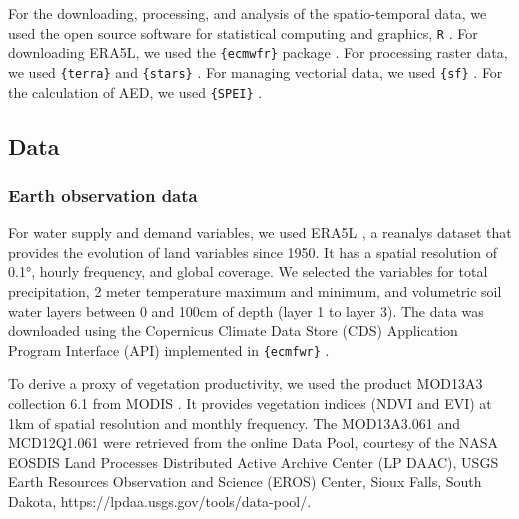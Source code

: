 \documentclass[
  number,
  preprint,
  3p,
  onecolumn]{elsarticle}
\begin{document}
For the downloading, processing, and analysis of the spatio-temporal
data, we used the open source software for statistical computing and
graphics, \texttt{R} \citep{R2023}. For downloading ERA5L, we used the
\texttt{\{ecmwfr\}} package \citep{Hufkens2019}. For processing raster
data, we used \texttt{\{terra\}} \citep{Hijmans2023} and
\texttt{\{stars\}} \citep{Pebesma2023}. For managing vectorial data, we
used \texttt{\{sf\}} \citep{Pebesma2018}. For the calculation of AED, we
used \texttt{\{SPEI\}} \citep{Bergueria2023}.

\hypertarget{data}{%
\subsection{Data}\label{data}}

\hypertarget{earth-observation-data}{%
\subsubsection{Earth observation data}\label{earth-observation-data}}

For water supply and demand variables, we used ERA5L
\citep{MunozSabater2021}, a reanalys dataset that provides the evolution
of land variables since 1950. It has a spatial resolution of 0.1°,
hourly frequency, and global coverage. We selected the variables for
total precipitation, 2 meter temperature maximum and minimum, and
volumetric soil water layers between 0 and 100cm of depth (layer 1 to
layer 3). The data was downloaded using the Copernicus Climate Data
Store (CDS) Application Program Interface (API) implemented in
\texttt{\{ecmfwr\}} \citep{Hufkens2019}.

To derive a proxy of vegetation productivity, we used the product
MOD13A3 collection 6.1 from MODIS \citep{Didan2015}. It provides
vegetation indices (NDVI and EVI) at 1km of spatial resolution and
monthly frequency. The MOD13A3.061 and MCD12Q1.061 were retrieved from
the online Data Pool, courtesy of the NASA EOSDIS Land Processes
Distributed Active Archive Center (LP DAAC), USGS Earth Resources
Observation and Science (EROS) Center, Sioux Falls, South Dakota,
https://lpdaa.usgs.gov/tools/data-pool/.
\end{document}
